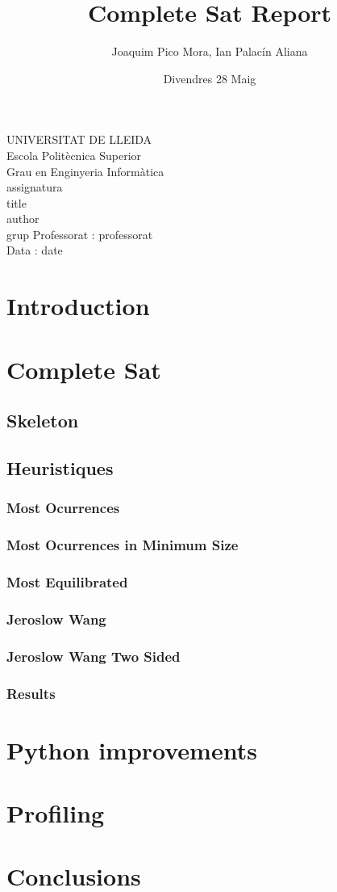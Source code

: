 \documentclass{article}
\title{Complete Sat Report}
\author{Joaquim Pico Mora, Ian Palacín Aliana}
\date{Divendres 28 Maig}
\renewcommand{\maketitle}{ %
	\begin{titlepage}
		\raggedright{UNIVERSITAT DE LLEIDA \\
			Escola Politècnica Superior \\
			Grau en Enginyeria Informàtica\\
			\1assignatura\\}
		\vspace{5cm}
		\centering\huge{\5title \\}
		\vspace{3cm}
		\large{\6author} \\
		\normalsize{\3grup}
		\vfill
		Professorat : \4professorat \\
		Data : \7date
\end{titlepage}}
\begin{document}
	\maketitle
	\thispagestyle{empty}


\section{Introduction}
\section{Complete Sat}
%
\subsection{Skeleton}
%
\subsection{Heuristiques}
%
\subsubsection{Most Ocurrences}
%
\subsubsection{Most Ocurrences in Minimum Size}
%
\subsubsection{Most Equilibrated}
%
\subsubsection{Jeroslow Wang}
%
\subsubsection{Jeroslow Wang Two Sided}
%
\subsubsection{Results}
%
\section{Python improvements}
%
\section{Profiling}
%
\section{Conclusions}
\end{document}
